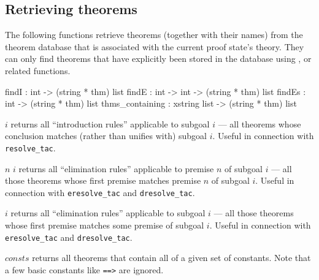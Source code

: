 \subsection{Retrieving theorems}

The following functions retrieve theorems (together with their names)
from the theorem database that is associated with the current proof
state's theory.  They can only find theorems that have explicitly been
stored in the database using ,  or
related functions.
\begin{ttbox} 
findI           :          int -> (string * thm) list
findE           :   int -> int -> (string * thm) list
findEs          :          int -> (string * thm) list
thms_containing : xstring list -> (string * thm) list
\end{ttbox}
\begin{ttdescription}
\item[\ttindexbold{findI} $i$]
  returns all ``introduction rules'' applicable to subgoal $i$ --- all
  theorems whose conclusion matches (rather than unifies with) subgoal
  $i$.  Useful in connection with \texttt{resolve_tac}.

\item[\ttindexbold{findE} $n$ $i$] returns all ``elimination rules''
  applicable to premise $n$ of subgoal $i$ --- all those theorems whose
  first premise matches premise $n$ of subgoal $i$.  Useful in connection with
  \texttt{eresolve_tac} and \texttt{dresolve_tac}.

\item[\ttindexbold{findEs} $i$] returns all ``elimination rules'' applicable
  to subgoal $i$ --- all those theorems whose first premise matches some
  premise of subgoal $i$.  Useful in connection with \texttt{eresolve_tac} and
  \texttt{dresolve_tac}.
  
\item[\ttindexbold{thms_containing} $consts$] returns all theorems
  that contain all of a given set of constants.  Note that a few basic
  constants like \verb$==>$ are ignored.
\end{ttdescription}


